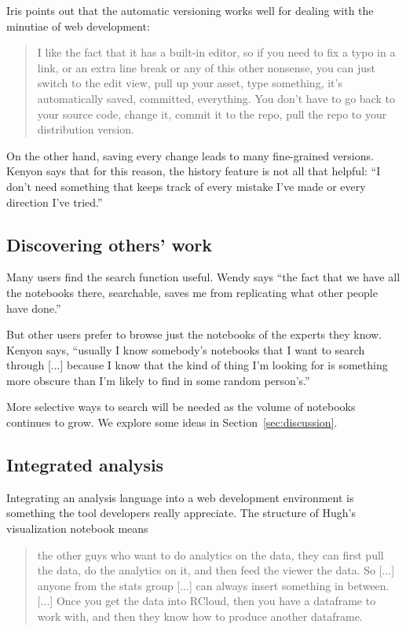 
Iris points out that the automatic versioning works well for dealing with the
minutiae of web development:
\begin{quote}
I like the fact that it has a built-in editor, so
if you need to fix a typo in a link, or an extra line break or any of this other
nonsense, you can just switch to the edit view, pull up your asset, type
something, it's automatically saved, committed, everything. You don't have to go
back to your source code, change it, commit it to the repo, pull the repo to
your distribution version. 
\end{quote}

On the other hand, saving every change leads to many fine-grained
versions. Kenyon says that for this reason, the history feature is not all that
helpful: ``I don't need something that keeps track of every mistake I've made or
every direction I've tried.''


\subsection{Discovering others' work}
Many users find the search function useful. Wendy says ``the fact that we have
all the notebooks there, searchable, saves me from replicating what other people
have done.''

But other users prefer to browse just the notebooks of the experts they
know. Kenyon says, ``usually I know somebody's notebooks that I want to search
through [...] because I know that the kind of thing I'm looking for is something
more obscure than I'm likely to find in some random person's.''

More selective ways to search will be needed as the volume of notebooks
continues to grow. We explore some ideas in Section~\ref{sec:discussion}.

\subsection{Integrated analysis}
Integrating an analysis language into a web development environment is something
the tool developers really appreciate.  The structure of Hugh's visualization
notebook means
\begin{quote}
the other guys who want to do analytics on the data, they can first pull
the data, do the analytics on it, and then feed the viewer the data. So
[...] anyone from the stats group [...] can always insert something in
between. [...] Once you get the data into RCloud, then you have a
dataframe to work with, and then they know how to produce another
dataframe.
\end{quote}

